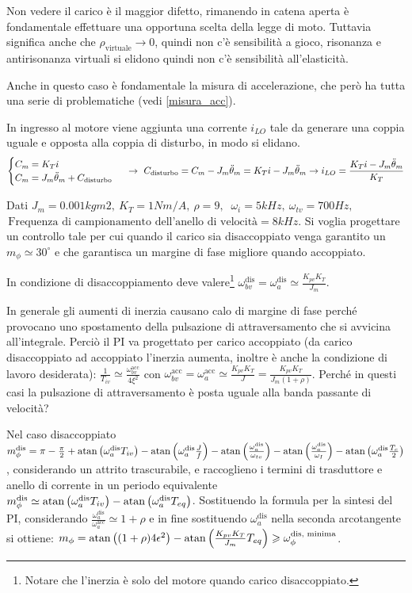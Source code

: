 Non vedere il carico è il maggior difetto, rimanendo in catena aperta è fondamentale effettuare una opportuna scelta della legge di moto.
Tuttavia significa anche che \(\rho_\text{virtuale} \rightarrow 0\), quindi non c'è sensibilità a gioco, risonanza e antirisonanza virtuali si elidono quindi non c'è sensibilità all'elasticità.

Anche in questo caso è fondamentale la misura di accelerazione, che però ha tutta una serie di problematiche (vedi \ref{misura_acc}).

In ingresso al motore viene aggiunta una corrente \(i_{LO}\) tale da generare una coppia uguale e opposta alla coppia di disturbo, in modo si elidano.
\[\begin{cases}
    C_m = K_T i \\
    C_m = J_m \Ddot{\theta}_m + C_\text{disturbo}
\end{cases} \ \rightarrow \ C_\text{disturbo} = C_m - J_m \Ddot{\theta}_m = K_T i - J_m \Ddot{\theta}_m \rightarrow i_{LO} = \frac{K_T i - J_m \Ddot{\theta}_m}{K_T} \]  

Dati \(J_m=0.001 kgm2, \ K_T=1 Nm/A, \ \rho = 9, \) \( \ \omega_i = 5 kHz, \ \omega_{tv}=700 Hz, \) \( \, \text{Frequenza di campionamento dell’anello di velocità} = 8 kHz\).
Si voglia progettare un controllo tale per cui quando il carico sia disaccoppiato venga garantito un \(m_\phi \simeq 30^\circ\) e che garantisca un margine di fase migliore quando accoppiato.

In condizione di disaccoppiamento deve valere\footnote{Notare che l'inerzia è solo del motore quando carico disaccoppiato.} \(\omega_{bv}^\text{dis} = \omega_a^\text{dis} \simeq \frac{K_{pv}K_T}{J_m}\).

In generale gli aumenti di inerzia causano calo di margine di fase perché provocano uno spostamento della pulsazione di attraversamento che si avvicina all'integrale. Perciò il PI va progettato per carico accoppiato (da carico disaccoppiato ad accoppiato l'inerzia aumenta, inoltre è anche la condizione di lavoro desiderata): \(\frac{1}{T_{iv}} \simeq \frac{\omega_{bv}^\text{acc}}{4\xi^2}\) con \(\omega_{bv}^\text{acc} = \omega_{a}^\text{acc} \simeq \frac{K_{pv}K_T}{J} = \frac{K_{pv}K_T}{J_m (1+\rho)}\). {\color{red} Perché in questi casi la pulsazione di attraversamento è posta uguale alla banda passante di velocità?}

Nel caso disaccoppiato \(m_\phi^\text{dis} = \pi - \frac{\pi}{2} + \operatorname{atan}\left( \omega_a^\text{dis} T_{iv} \right) - \operatorname{atan}\left( \omega_a^\text{dis} \frac{J}{f} \right) - \operatorname{atan}\left( \frac{\omega_a^\text{dis}}{\omega_{tv}} \right) - \operatorname{atan}\left( \frac{\omega_a^\text{dis}}{\omega_I} \right) - \operatorname{atan}\left( \omega_a^\text{dis} \frac{T_c}{2} \right) \), considerando un attrito trascurabile, e raccoglieno i termini di trasduttore e anello di corrente in un periodo equivalente \(m_\phi^\text{dis} \simeq \operatorname{atan}\left( \omega_a^\text{dis} T_{iv} \right) - \operatorname{atan}\left( \omega_a^\text{dis} T_{eq} \right) \). Sostituendo la formula per la sintesi del PI, considerando \(\frac{\omega_a^\text{dis}}{\omega_a^\text{acc}} \simeq 1+\rho\) e in fine sostituendo \(\omega_a^\text{dis}\) nella seconda arcotangente si ottiene: \(m_\phi = \operatorname{atan}\left( (1+\rho) 4 \epsilon^2 \right) - \operatorname{atan}\left( \frac{K_{pv}K_T}{J_m} T_{eq} \right) \geqslant \omega_\phi^\text{dis, minima}\).

